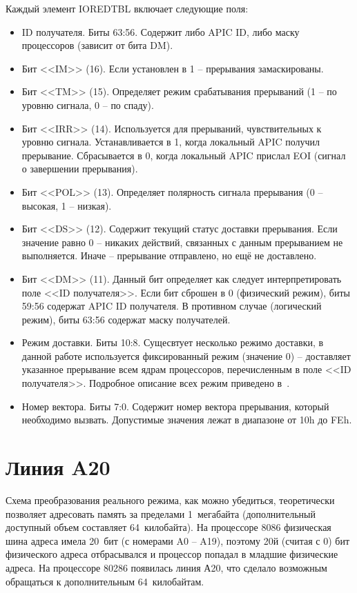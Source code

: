 Каждый элемент IOREDTBL включает следующие поля:
\begin{itemize}
\item ID получателя. Биты 63:56. Содержит либо APIC ID, либо маску процессоров (зависит от бита DM).
\item Бит <<IM>> (16). Если установлен в 1 -- прерывания замаскированы.
\item Бит <<TM>> (15). Определяет режим срабатывания прерываний (1 -- по уровню сигнала, 0 -- по спаду).
\item Бит <<IRR>> (14). Используется для прерываний, чувствительных к уровню сигнала. Устанавливается в 1,
	когда локальный APIC получил прерывание. Сбрасывается в 0, когда локальный APIC прислал EOI (сигнал
	о завершении прерывания).
\item Бит <<POL>> (13). Определяет полярность сигнала прерывания (0 -- высокая, 1 -- низкая).
\item Бит <<DS>> (12). Содержит текущий статус доставки прерывания. Если значение равно 0 -- никаких действий,
	связанных с данным прерыванием не выполняется. Иначе -- прерывание отправлено, но ещё не доставлено.
\item Бит <<DM>> (11). Данный бит определяет как следует интерпретировать поле <<ID получателя>>.
	Если бит сброшен в 0 (физический режим), биты 59:56 содержат APIC ID получателя. В
	противном случае (логический режим), биты 63:56 содержат маску получателей.
\item Режим доставки. Биты 10:8. Сущесвтует несколько режимо доставки, в данной работе используется
	фиксированный режим (значение 0) -- доставляет указанное прерывание всем ядрам процессоров,
	перечисленным в поле <<ID получателя>>. Подробное описание всех режим приведено в~\cite{ioapic}.
\item Номер вектора. Биты 7:0. Содержит номер вектора прерывания, который необходимо вызвать.
	Допустимые значения лежат в диапазоне от 10h до FEh.
\end{itemize}


\section{Линия A20}
Схема преобразования реального режима, как можно убедиться, теоретически позволяет адресовать
память за пределами 1~мегабайта (дополнительный доступный объем составляет 64~килобайта). На
процессоре 8086 физическая шина адреса имела 20~бит (с номерами A0 -- A19), поэтому 20й (считая с 0)
бит физического адреса отбрасывался и процессор попадал в младшие физические адреса. На
процессоре 80286 появилась линия А20, что сделало возможным обращаться к дополнительным 64~килобайтам.

